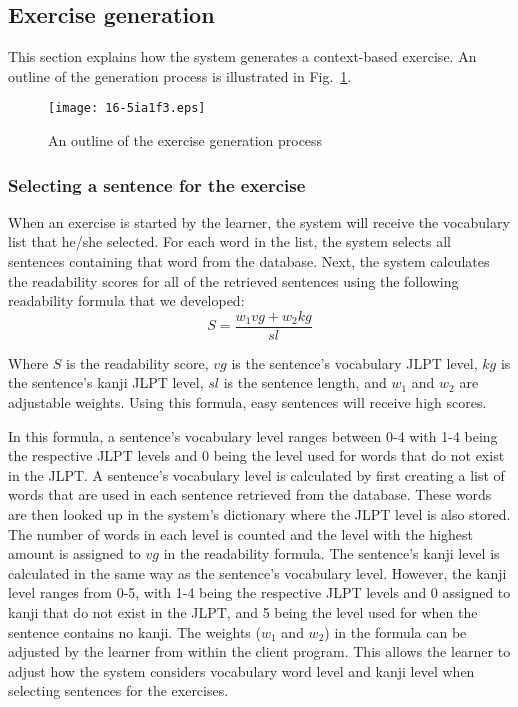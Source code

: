 \documentclass[english]{jnlp_1.4}
\begin{document}
\subsection{Exercise generation}

This section explains how the system generates a context-based exercise. An outline of the generation process is illustrated in Fig.~\ref{fig3}.

\begin{figure}[b]
\begin{center}
  \texttt{[image: 16-5ia1f3.eps]}
\end{center}
  \caption{An outline of the exercise generation process}
  \label{fig3}
\end{figure}


\subsubsection{Selecting a sentence for the exercise}

When an exercise is started by the learner, the system will receive the vocabulary list that he/she selected. For each word in the list, the system selects all sentences containing that word from the database. Next, the system calculates the readability scores for all of the retrieved sentences using the following readability formula that we developed:
\begin{equation}\label{rf2}
S = \frac{w_1vg + w_2kg}{sl}
\end{equation}

Where $S$ is the readability score, $vg$ is the sentence's vocabulary JLPT level, $kg$ is the sentence's kanji JLPT level, $sl$ is the sentence length, and $w_1$ and $w_2$ are adjustable weights. Using this formula, easy sentences will receive high scores.

In this formula, a sentence's vocabulary level ranges between 0-4 with 1-4 being the respective JLPT levels and 0 being the level used for words that do not exist in the JLPT. A sentence's vocabulary level is calculated by first creating a list of words that are used in each sentence retrieved from the database. These words are then looked up in the system's dictionary where the JLPT level is also stored. The number of words in each level is counted and the level with the highest amount is assigned to $vg$ in the readability formula. The sentence's kanji level is calculated in the same way as the sentence's vocabulary level. However, the kanji level ranges from 0-5, with 1-4 being the respective JLPT levels and 0 assigned to kanji that do not exist in the JLPT, and 5 being the level used for when the sentence contains no kanji. The weights ($w_1$ and $w_2$) in the formula can be adjusted by the learner from within the client program. This allows the learner to adjust how the system considers vocabulary word level and kanji level when selecting sentences for the exercises.
\end{document}
